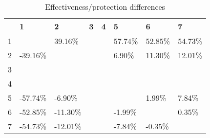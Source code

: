 \begin{table}[ht]
\centering
\begin{tabular}{rlllllll}
  \hline
 & 1 & 2 & 3 & 4 & 5 & 6 & 7 \\ 
  \hline
1 &  & 39.16\% &  &  & 57.74\% & 52.85\% & 54.73\% \\ 
  2 & -39.16\% &  &  &  & 6.90\% & 11.30\% & 12.01\% \\ 
  3 &  &  &  &  &  &  &  \\ 
  4 &  &  &  &  &  &  &  \\ 
  5 & -57.74\% & -6.90\% &  &  &  & 1.99\% & 7.84\% \\ 
  6 & -52.85\% & -11.30\% &  &  & -1.99\% &  & 0.35\% \\ 
  7 & -54.73\% & -12.01\% &  &  & -7.84\% & -0.35\% &  \\ 
   \hline
\end{tabular}
\caption{Effectiveness/protection differences} 
\end{table}
